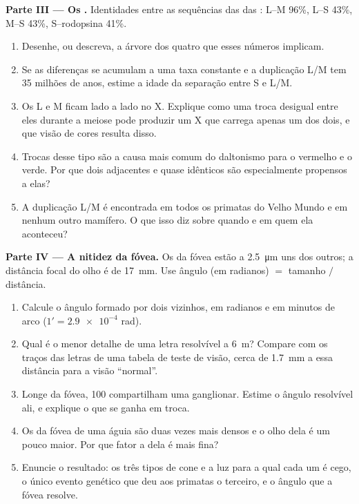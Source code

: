 \begin{problem}
\medskip
\noindent\textbf{Parte III --- Os .}
Identidades entre as sequências das  das : L--M 96\%,
L--S 43\%, M--S 43\%, S--rodopsina 41\%.
\begin{enumerate}[resume]
  \item Desenhe, ou descreva, a árvore dos quatro  que esses
        números implicam.
  \item Se as diferenças se acumulam a uma taxa constante e a
        duplicação L/M tem 35 milhões de anos, estime a idade da
        separação entre S e L/M.
  \item Os  L e M ficam lado a lado no X. Explique como uma troca
        desigual entre eles durante a meiose pode produzir um X que
        carrega apenas um dos dois, e que visão de cores resulta disso.
  \item Trocas desse tipo são a causa mais comum do daltonismo para o
        vermelho e o verde. Por que dois  adjacentes e quase
        idênticos são especialmente propensos a elas?
  \item A duplicação L/M é encontrada em todos os primatas do Velho
        Mundo e em nenhum outro mamífero. O que isso diz sobre quando e
        em quem ela aconteceu?
\end{enumerate}

\medskip
\noindent\textbf{Parte IV --- A nitidez da fóvea.}
Os  da fóvea estão a \qty{2.5}{\micro m} uns dos outros; a
distância focal do olho é de \qty{17}{mm}. Use ângulo (em radianos) $=$
tamanho $/$ distância.
\begin{enumerate}[resume]
  \item Calcule o ângulo formado por dois  vizinhos, em radianos e
        em minutos de arco ($1' = \num{2.9e-4}$ rad).
  \item Qual é o menor detalhe de uma letra resolvível a \qty{6}{m}?
        Compare com os traços das letras de uma tabela de teste de
        visão, cerca de \qty{1.7}{mm} a essa distância para a visão
        ``normal''.
  \item Longe da fóvea, 100  compartilham uma 
        ganglionar. Estime o ângulo resolvível ali, e explique o que se
        ganha em troca.
  \item Os  da fóvea de uma águia são duas vezes mais densos e o
        olho dela é um pouco maior. Por que fator a  dela é
        mais fina?
  \item Enuncie o resultado: os três tipos de cone e a luz para a qual
        cada um é cego, o único evento genético que deu aos primatas o
        terceiro, e o ângulo que a fóvea resolve.
\end{enumerate}
\end{problem}
